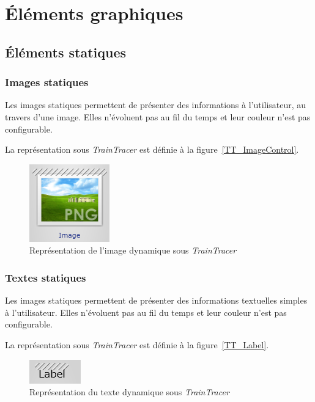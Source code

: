 \documentclass{AlstomLibrary}
\newcommand{\progname}[1]{\textit{#1}}
\newcommand{\TT}{{\progname{TrainTracer}} }
\begin{document}
\section{Éléments graphiques}

\subsection{Éléments statiques}

\subsubsection{Images statiques}

Les images statiques permettent de présenter des informations à l'utilisateur, au travers d'une image. Elles n'évoluent pas au fil du temps et leur couleur n'est pas configurable.

La représentation sous \TT est définie à la figure~\vref{TT_ImageControl}.

\begin{figure}\centering
\includegraphics[scale=1]{TT_ImageControl.png}
\caption{Représentation de l'image dynamique sous \TT}\label{TT_ImageControl}
\end{figure}

\subsubsection{Textes statiques}

Les images statiques permettent de présenter des informations textuelles simples à l'utilisateur. Elles n'évoluent pas au fil du temps et leur couleur n'est pas configurable.

La représentation sous \TT est définie à la figure~\vref{TT_Label}.

\begin{figure}\centering
\includegraphics[scale=1]{TT_Label.png}
\caption{Représentation du texte dynamique sous \TT}\label{TT_Label}
\end{figure}
\end{document}
